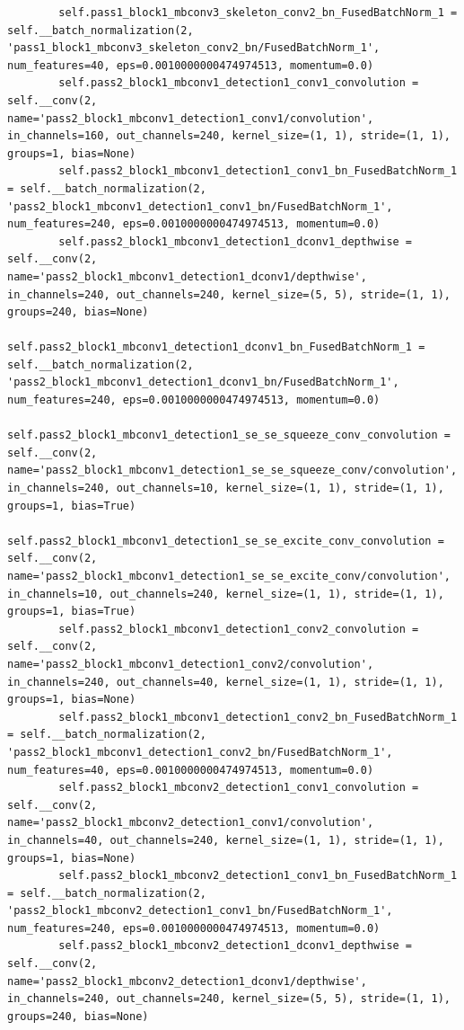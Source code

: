 \documentclass{fisatprojectfinal}
\begin{document}
\begin{appendices}
\begin{lstlisting}
        self.pass1_block1_mbconv3_skeleton_conv2_bn_FusedBatchNorm_1 = self.__batch_normalization(2, 'pass1_block1_mbconv3_skeleton_conv2_bn/FusedBatchNorm_1', num_features=40, eps=0.0010000000474974513, momentum=0.0)
        self.pass2_block1_mbconv1_detection1_conv1_convolution = self.__conv(2, name='pass2_block1_mbconv1_detection1_conv1/convolution', in_channels=160, out_channels=240, kernel_size=(1, 1), stride=(1, 1), groups=1, bias=None)
        self.pass2_block1_mbconv1_detection1_conv1_bn_FusedBatchNorm_1 = self.__batch_normalization(2, 'pass2_block1_mbconv1_detection1_conv1_bn/FusedBatchNorm_1', num_features=240, eps=0.0010000000474974513, momentum=0.0)
        self.pass2_block1_mbconv1_detection1_dconv1_depthwise = self.__conv(2, name='pass2_block1_mbconv1_detection1_dconv1/depthwise', in_channels=240, out_channels=240, kernel_size=(5, 5), stride=(1, 1), groups=240, bias=None)
        self.pass2_block1_mbconv1_detection1_dconv1_bn_FusedBatchNorm_1 = self.__batch_normalization(2, 'pass2_block1_mbconv1_detection1_dconv1_bn/FusedBatchNorm_1', num_features=240, eps=0.0010000000474974513, momentum=0.0)
        self.pass2_block1_mbconv1_detection1_se_se_squeeze_conv_convolution = self.__conv(2, name='pass2_block1_mbconv1_detection1_se_se_squeeze_conv/convolution', in_channels=240, out_channels=10, kernel_size=(1, 1), stride=(1, 1), groups=1, bias=True)
        self.pass2_block1_mbconv1_detection1_se_se_excite_conv_convolution = self.__conv(2, name='pass2_block1_mbconv1_detection1_se_se_excite_conv/convolution', in_channels=10, out_channels=240, kernel_size=(1, 1), stride=(1, 1), groups=1, bias=True)
        self.pass2_block1_mbconv1_detection1_conv2_convolution = self.__conv(2, name='pass2_block1_mbconv1_detection1_conv2/convolution', in_channels=240, out_channels=40, kernel_size=(1, 1), stride=(1, 1), groups=1, bias=None)
        self.pass2_block1_mbconv1_detection1_conv2_bn_FusedBatchNorm_1 = self.__batch_normalization(2, 'pass2_block1_mbconv1_detection1_conv2_bn/FusedBatchNorm_1', num_features=40, eps=0.0010000000474974513, momentum=0.0)
        self.pass2_block1_mbconv2_detection1_conv1_convolution = self.__conv(2, name='pass2_block1_mbconv2_detection1_conv1/convolution', in_channels=40, out_channels=240, kernel_size=(1, 1), stride=(1, 1), groups=1, bias=None)
        self.pass2_block1_mbconv2_detection1_conv1_bn_FusedBatchNorm_1 = self.__batch_normalization(2, 'pass2_block1_mbconv2_detection1_conv1_bn/FusedBatchNorm_1', num_features=240, eps=0.0010000000474974513, momentum=0.0)
        self.pass2_block1_mbconv2_detection1_dconv1_depthwise = self.__conv(2, name='pass2_block1_mbconv2_detection1_dconv1/depthwise', in_channels=240, out_channels=240, kernel_size=(5, 5), stride=(1, 1), groups=240, bias=None)

\end{lstlisting}
\end{appendices}
\end{document}
